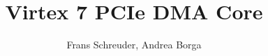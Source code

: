 \author{Frans Schreuder, Andrea Borga}
\title{Virtex 7 PCIe DMA Core}

\date{\SetDocumentDate}
\def\DocVer{Rev 1.9}
\def\SetDocumentDate{07-01-2015}














